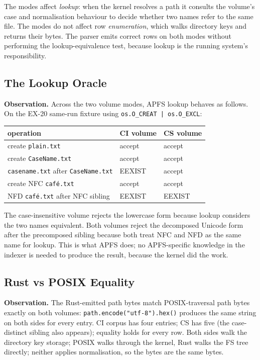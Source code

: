 The modes affect \emph{lookup}: when the kernel resolves a path it
consults the volume's case and normalisation behaviour to decide
whether two names refer to the same file. The modes do not affect
row \emph{enumeration}, which walks directory keys and returns
their bytes. The parser emits correct rows on both modes without
performing the lookup-equivalence test, because lookup is the
running system's responsibility.

\subsection{The Lookup Oracle}

\textbf{Observation.} Across the two volume modes, APFS lookup
behaves as follows. On the EX-20 same-run fixture using
\texttt{os.O\_CREAT | os.O\_EXCL}:

\begin{center}
\begin{tabular}{lll}
\toprule
operation & CI volume & CS volume \\
\midrule
create \texttt{plain.txt}                          & accept & accept \\
create \texttt{CaseName.txt}                       & accept & accept \\
\texttt{casename.txt} after \texttt{CaseName.txt}  & EEXIST & accept \\
create NFC \texttt{caf\'e.txt}                     & accept & accept \\
NFD \texttt{caf\'e.txt} after NFC sibling          & EEXIST & EEXIST \\
\bottomrule
\end{tabular}
\end{center}

The case-insensitive volume rejects the lowercase form because lookup
considers the two names equivalent. Both volumes reject the
decomposed Unicode form after the precomposed sibling because both
treat NFC and NFD as the same name for lookup. This is what APFS does;
no APFS-specific knowledge in the indexer is needed to produce the
result, because the kernel did the work.

\subsection{Rust vs POSIX Equality}

\textbf{Observation.} The Rust-emitted path bytes match
POSIX-traversal path bytes exactly on both volumes:
\texttt{path.encode("utf-8").hex()} produces the same string on
both sides for every entry. CI corpus has four entries; CS has
five (the case-distinct sibling also appears); equality holds for
every row. Both sides walk the directory key storage; POSIX walks
through the kernel, Rust walks the FS tree directly; neither
applies normalisation, so the bytes are the same bytes.

